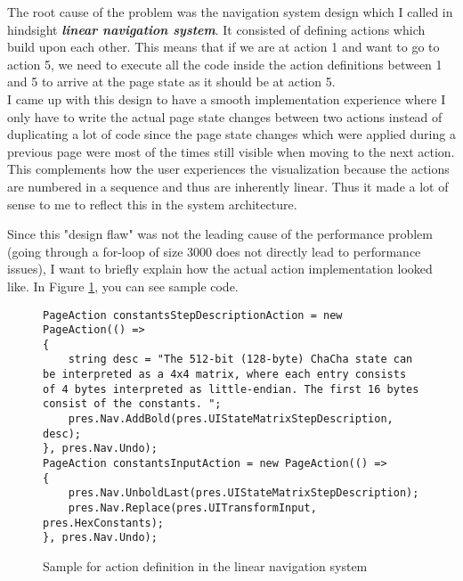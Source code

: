 The root cause of the problem was the navigation system design which I called in hindsight \textbf{\textit{linear navigation system}}. It consisted of defining actions which build upon each other. This means that if we are at action 1 and want to go to action 5, we need to execute all the code inside the action definitions between 1 and 5 to arrive at the page state as it should be at action 5. \\
I came up with this design to have a smooth implementation experience where I only have to write the actual page state changes between two actions instead of duplicating a lot of code since the page state changes which were applied during a previous page were most of the times still visible when moving to the next action. This complements how the user experiences the visualization because the actions are numbered in a sequence and thus are inherently linear. Thus it made a lot of sense to me to reflect this in the system architecture.
\par
Since this "design flaw" was not the leading cause of the performance problem (going through a for-loop of size 3000 does not directly lead to performance issues), I want to briefly explain how the actual action implementation looked like. In Figure \ref{code.linear}, you can see sample code.

\begin{figure}
\caption{Sample for action definition in the linear navigation system}
\label{code.linear}
\begin{verbatim}
PageAction constantsStepDescriptionAction = new PageAction(() =>
{
	string desc = "The 512-bit (128-byte) ChaCha state can be interpreted as a 4x4 matrix, where each entry consists of 4 bytes interpreted as little-endian. The first 16 bytes consist of the constants. ";
	pres.Nav.AddBold(pres.UIStateMatrixStepDescription, desc);
}, pres.Nav.Undo);
PageAction constantsInputAction = new PageAction(() =>
{
	pres.Nav.UnboldLast(pres.UIStateMatrixStepDescription);
	pres.Nav.Replace(pres.UITransformInput, pres.HexConstants);
}, pres.Nav.Undo);
\end{verbatim}
\end{figure}